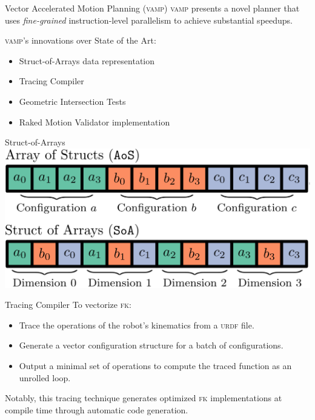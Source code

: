 \documentclass{beamer}
\newcommand{\todo}[1]{\textit{\textcolor{red}{#1}}}
\begin{document}
\begin{frame}{Vector Accelerated Motion Planning (\textsc{vamp})}
\textsc{vamp} presents a novel planner that uses \textit{fine-grained} instruction-level parallelism to achieve substantial speedups.

\vspace{10px}

\pause
\textsc{vamp}'s innovations over State of the Art:
\begin{itemize}
\item Struct-of-Arrays data representation
\item Tracing Compiler
\item Geometric Intersection Tests
\item Raked Motion Validator implementation
\end{itemize}
\end{frame}

\begin{frame}{Struct-of-Arrays}
\centering
\includegraphics[width=\textwidth]{./assets/soa_aos.png}
\end{frame}
%

\begin{frame}{Tracing Compiler}
To vectorize \textsc{fk}:
\begin{itemize}
\item Trace the operations of the robot's kinematics from a \textsc{urdf} file.
\item Generate a vector configuration structure for a batch of configurations. 
\item Output a minimal set of operations to compute the traced function as an unrolled loop.
\end{itemize}

Notably, this tracing technique generates optimized \textsc{fk} implementations at compile time through automatic code generation.
\end{frame}
\end{document}
